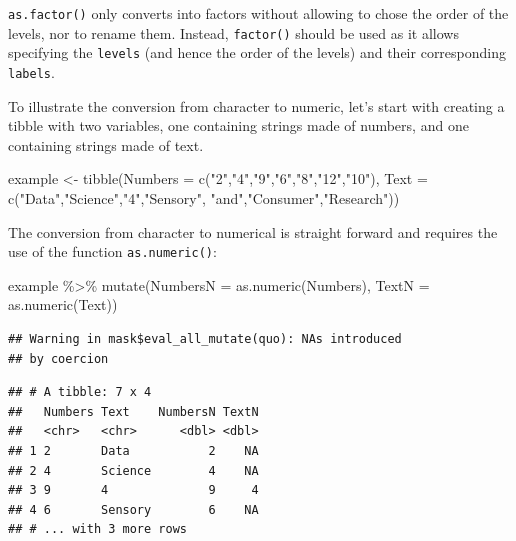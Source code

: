 \documentclass[
]{krantz}
\makeatletter
\newenvironment{Shaded}{\begin{snugshade}}{\end{snugshade}}
\newcommand{\AttributeTok}[1]{\textcolor[rgb]{0.61,0.61,0.61}{#1}}
\newcommand{\FunctionTok}[1]{\textcolor[rgb]{0,0,0}{#1}}
\newcommand{\NormalTok}[1]{#1}
\newcommand{\OtherTok}[1]{\textcolor[rgb]{0.37,0.37,0.37}{#1}}
\newcommand{\SpecialCharTok}[1]{\textcolor[rgb]{0,0,0}{#1}}
\newcommand{\StringTok}[1]{\textcolor[rgb]{0.5,0.5,0.5}{#1}}
\renewenvironment{quote}{\begin{VF}}{\end{VF}}
\newenvironment{kframe}{%
\medskip{}
\setlength{\fboxsep}{.8em}
 \def\at@end@of@kframe{}%
 \ifinner\ifhmode%
  \def\at@end@of@kframe{\end{minipage}}%
  \begin{minipage}{\columnwidth}%
 \fi\fi%
 \def\FrameCommand##1{\hskip\@totalleftmargin \hskip-\fboxsep
 \colorbox{shadecolor}{##1}\hskip-\fboxsep
     \hskip-\linewidth \hskip-\@totalleftmargin \hskip\columnwidth}%
 \MakeFramed {\advance\hsize-\width
   \@totalleftmargin\z@ \linewidth\hsize
   \@setminipage}}%
 {\par\unskip\endMakeFramed%
 \at@end@of@kframe}
\renewenvironment{Shaded}{\begin{kframe}}{\end{kframe}}
\makeatother
\begin{document}
\begin{quote}
\texttt{as.factor()} only converts into factors without allowing to chose the order of the levels, nor to rename them. Instead, \texttt{factor()} should be used as it allows specifying the \texttt{levels} (and hence the order of the levels) and their corresponding \texttt{labels}.
\end{quote}

To illustrate the conversion from character to numeric, let's start with creating a tibble with two variables, one containing strings made of numbers, and one containing strings made of text.

\begin{Shaded}
\begin{Highlighting}[]
\NormalTok{example }\OtherTok{\textless{}{-}} \FunctionTok{tibble}\NormalTok{(}\AttributeTok{Numbers =} \FunctionTok{c}\NormalTok{(}\StringTok{"2"}\NormalTok{,}\StringTok{"4"}\NormalTok{,}\StringTok{"9"}\NormalTok{,}\StringTok{"6"}\NormalTok{,}\StringTok{"8"}\NormalTok{,}\StringTok{"12"}\NormalTok{,}\StringTok{"10"}\NormalTok{),}
                  \AttributeTok{Text =} \FunctionTok{c}\NormalTok{(}\StringTok{"Data"}\NormalTok{,}\StringTok{"Science"}\NormalTok{,}\StringTok{"4"}\NormalTok{,}\StringTok{"Sensory"}\NormalTok{,}
                           \StringTok{"and"}\NormalTok{,}\StringTok{"Consumer"}\NormalTok{,}\StringTok{"Research"}\NormalTok{))}
\end{Highlighting}
\end{Shaded}

The conversion from character to numerical is straight forward and requires the use of the function \texttt{as.numeric()}:

\begin{Shaded}
\begin{Highlighting}[]
\NormalTok{example }\SpecialCharTok{\%\textgreater{}\%} 
  \FunctionTok{mutate}\NormalTok{(}\AttributeTok{NumbersN =} \FunctionTok{as.numeric}\NormalTok{(Numbers), }\AttributeTok{TextN =} \FunctionTok{as.numeric}\NormalTok{(Text))}
\end{Highlighting}
\end{Shaded}

\begin{verbatim}
## Warning in mask$eval_all_mutate(quo): NAs introduced
## by coercion
\end{verbatim}

\begin{verbatim}
## # A tibble: 7 x 4
##   Numbers Text    NumbersN TextN
##   <chr>   <chr>      <dbl> <dbl>
## 1 2       Data           2    NA
## 2 4       Science        4    NA
## 3 9       4              9     4
## 4 6       Sensory        6    NA
## # ... with 3 more rows
\end{verbatim}
\end{document}

